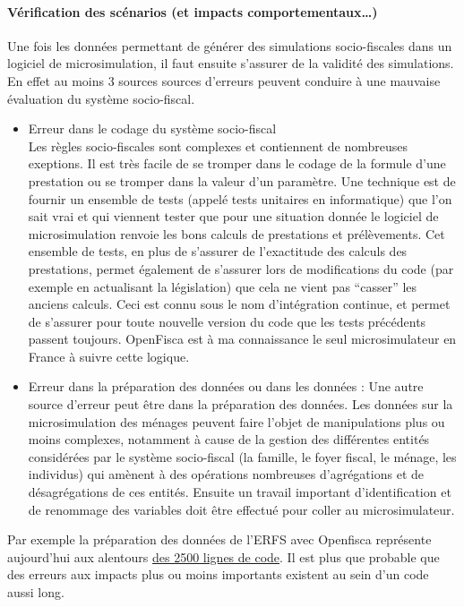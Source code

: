 \paragraph{Vérification des scénarios (et impacts
comportementaux\ldots)}

Une fois les données permettant de générer des simulations
socio-fiscales dans un logiciel de microsimulation, il faut ensuite
s'assurer de la validité des simulations. En effet au moins 3 sources
sources d'erreurs peuvent conduire à une mauvaise évaluation du système
socio-fiscal.

\begin{itemize}
\item
  Erreur dans le codage du système socio-fiscal\\
  Les règles socio-fiscales sont complexes et contiennent de nombreuses
  exeptions. Il est très facile de se tromper dans le codage de la
  formule d'une prestation ou se tromper dans la valeur d'un paramètre.
  Une technique est de fournir un ensemble de tests (appelé tests
  unitaires en informatique) que l'on sait vrai et qui viennent tester
  que pour une situation donnée le logiciel de microsimulation renvoie
  les bons calculs de prestations et prélèvements. Cet ensemble de
  tests, en plus de s'assurer de l'exactitude des calculs des
  prestations, permet également de s'assurer lors de modifications du
  code (par exemple en actualisant la législation) que cela ne vient pas
  ``casser'' les anciens calculs. Ceci est connu sous le nom
  d'intégration continue, et permet de s'assurer pour toute nouvelle
  version du code que les tests précédents passent toujours. OpenFisca
  est à ma connaissance le seul microsimulateur en France à suivre cette
  logique.
\item
  Erreur dans la préparation des données ou dans les données : Une autre
  source d'erreur peut être dans la préparation des données. Les données
  sur la microsimulation des ménages peuvent faire l'objet de
  manipulations plus ou moins complexes, notamment à cause de la gestion
  des différentes entités considérées par le système socio-fiscal (la
  famille, le foyer fiscal, le ménage, les individus) qui amènent à des
  opérations nombreuses d'agrégations et de désagrégations de ces
  entités. Ensuite un travail important d'identification et de renommage
  des variables doit être effectué pour coller au microsimulateur.
\end{itemize}

Par exemple la préparation des données de l'ERFS avec Openfisca
représente aujourd'hui aux alentours
\href{https://github.com/openfisca/openfisca-france-data/tree/518eb1742501f0cab732fbcb0111df6e6dd9a03f/openfisca_france_data/erfs/input_data_builder}{des
2500 lignes de code}. Il est plus que probable que des erreurs aux
impacts plus ou moins importants existent au sein d'un code aussi long.

